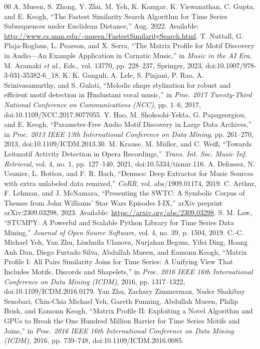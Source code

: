 \documentclass[conference]{IEEEtran}
\begin{document}
\begin{thebibliography}{00}
 A. Mueen, S. Zhong, Y. Zhu, M. Yeh, K. Kamgar, K. Viswanathan, C. Gupta, and E. Keogh, “The Fastest Similarity Search Algorithm for Time Series Subsequences under Euclidean Distance,” Aug. 2022. Available: \url{http://www.cs.unm.edu/~mueen/FastestSimilaritySearch.html}.
 T. Nuttall, G. Plaja-Roglans, L. Pearson, and X. Serra, ``The Matrix Profile for Motif Discovery in Audio—An Example Application in Carnatic Music,'' in \textit{Music in the AI Era}, M. Aramaki \textit{et al.}, Eds., vol. 13770, pp. 228--237, Springer, 2023, doi:10.1007/978-3-031-35382-6\_18.
 K. K. Ganguli, A. Lele, S. Pinjani, P. Rao, A. Srinivasamurthy, and S. Gulati, ``Melodic shape stylization for robust and efficient motif detection in Hindustani vocal music,'' in \textit{Proc. 2017 Twenty-Third National Conference on Communications (NCC)}, pp. 1--6, 2017, doi:10.1109/NCC.2017.8077055.
 Y. Hao, M. Shokoohi-Yekta, G. Papageorgiou, and E. Keogh, ``Parameter-Free Audio Motif Discovery in Large Data Archives,'' in \textit{Proc. 2013 IEEE 13th International Conference on Data Mining}, pp. 261--270, 2013, doi:10.1109/ICDM.2013.30.
 M. Krause, M. Müller, and C. Weiß, ``Towards Leitmotif Activity Detection in Opera Recordings,'' \textit{Trans. Int. Soc. Music Inf. Retrieval}, vol. 4, no. 1, pp. 127--140, 2021, doi:10.5334/tismir.116.
 A. Defossez, N. Usunier, L. Bottou, and F. R. Bach, ``Demucs: Deep Extractor for Music Sources with extra unlabeled data remixed,'' \textit{CoRR}, vol. abs/1909.01174, 2019.
 C. Arthur, F. Lehman, and J. McNamara, ``Presenting the SWTC: A Symbolic Corpus of Themes from John Williams' Star Wars Episodes I-IX,'' arXiv preprint arXiv:2309.03298, 2023. Available: \url{https://arxiv.org/abs/2309.03298}.
 S. M. Law, ``STUMPY: A Powerful and Scalable Python Library for Time Series Data Mining,'' \textit{Journal of Open Source Software}, vol. 4, no. 39, p. 1504, 2019.
 C.-C. Michael Yeh, Yan Zhu, Liudmila Ulanova, Nurjahan Begum, Yifei Ding, Hoang Anh Dau, Diego Furtado Silva, Abdullah Mueen, and Eamonn Keogh, ``Matrix Profile I: All Pairs Similarity Joins for Time Series: A Unifying View That Includes Motifs, Discords and Shapelets,'' in \textit{Proc. 2016 IEEE 16th International Conference on Data Mining (ICDM)}, 2016, pp. 1317--1322, doi:10.1109/ICDM.2016.0179.
 Yan Zhu, Zachary Zimmerman, Nader Shakibay Senobari, Chin-Chia Michael Yeh, Gareth Funning, Abdullah Mueen, Philip Brisk, and Eamonn Keogh, ``Matrix Profile II: Exploiting a Novel Algorithm and GPUs to Break the One Hundred Million Barrier for Time Series Motifs and Joins,'' in \textit{Proc. 2016 IEEE 16th International Conference on Data Mining (ICDM)}, 2016, pp. 739--748, doi:10.1109/ICDM.2016.0085.

\end{thebibliography}
\end{document}
